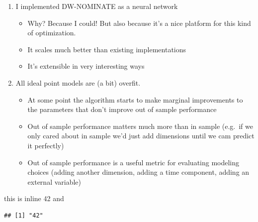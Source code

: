 \documentclass[11pt,]{article}
\newenvironment{Shaded}{\begin{snugshade}}{\end{snugshade}}
\newcommand{\OperatorTok}[1]{\textcolor[rgb]{0.81,0.36,0.00}{\textbf{#1}}}
\newcommand{\NormalTok}[1]{#1}
\providecommand{\tightlist}{%
\setlength{\itemsep}{0pt}\setlength{\parskip}{0pt}}
\begin{document}
\begin{enumerate}
\def\labelenumi{\arabic{enumi}.}
\tightlist
\item
  I implemented DW-NOMINATE as a neural network

  \begin{itemize}
  \tightlist
  \item
    Why? Because I could! But also because it's a nice platform for this
    kind of optimization.
  \item
    It scales much better than existing implementations
  \item
    It's extensible in very interesting ways
  \end{itemize}
\item
  All ideal point models are (a bit) overfit.

  \begin{itemize}
  \tightlist
  \item
    At some point the algorithm starts to make marginal improvements to
    the parameters that don't improve out of sample performance
  \item
    Out of sample performance matters much more than in sample (e.g.~if
    we only cared about in sample we'd just add dimensions until we cam
    predict it perfectly)
  \item
    Out of sample performance is a useful metric for evaluating modeling
    choices (adding another dimension, adding a time component, adding
    an external variable)
  \end{itemize}
\end{enumerate}

this is inline 42 and

\begin{Shaded}
\end{Shaded}

\begin{verbatim}
## [1] "42"
\end{verbatim}
\end{document}
